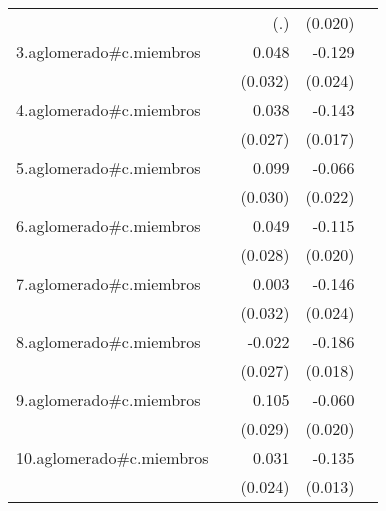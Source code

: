 {\begin{longtable}{l*{4}{D{.}{.}{-1}}}
            &                     &         (.)         &     (0.020)         &                     \\
\addlinespace
3.aglomerado#c.miembros&                     &       0.048         &      -0.129\sym{***}&                     \\
            &                     &     (0.032)         &     (0.024)         &                     \\
\addlinespace
4.aglomerado#c.miembros&                     &       0.038         &      -0.143\sym{***}&                     \\
            &                     &     (0.027)         &     (0.017)         &                     \\
\addlinespace
5.aglomerado#c.miembros&                     &       0.099\sym{***}&      -0.066\sym{**} &                     \\
            &                     &     (0.030)         &     (0.022)         &                     \\
\addlinespace
6.aglomerado#c.miembros&                     &       0.049         &      -0.115\sym{***}&                     \\
            &                     &     (0.028)         &     (0.020)         &                     \\
\addlinespace
7.aglomerado#c.miembros&                     &       0.003         &      -0.146\sym{***}&                     \\
            &                     &     (0.032)         &     (0.024)         &                     \\
\addlinespace
8.aglomerado#c.miembros&                     &      -0.022         &      -0.186\sym{***}&                     \\
            &                     &     (0.027)         &     (0.018)         &                     \\
\addlinespace
9.aglomerado#c.miembros&                     &       0.105\sym{***}&      -0.060\sym{**} &                     \\
            &                     &     (0.029)         &     (0.020)         &                     \\
\addlinespace
10.aglomerado#c.miembros&                     &       0.031         &      -0.135\sym{***}&                     \\
            &                     &     (0.024)         &     (0.013)         &                     \\

\end{longtable}}
